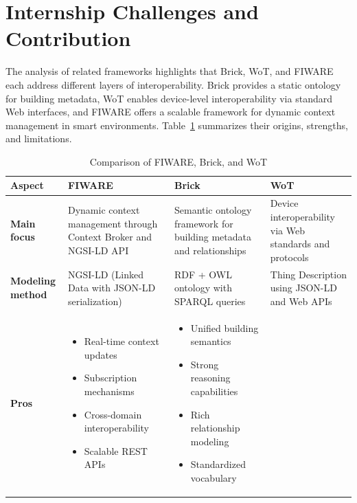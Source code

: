 \section{Internship Challenges and Contribution}

The analysis of related frameworks highlights that Brick, WoT, and
FIWARE each address different layers of interoperability.
Brick provides a static ontology for building metadata, WoT enables
device-level interoperability via standard Web interfaces, and
FIWARE offers a scalable framework for dynamic context
management in smart environments. Table~\ref{tab:comparison}
summarizes their origins, strengths, and limitations.

\begin{table}[htb]
\centering
\caption{Comparison of FIWARE, Brick, and WoT}
\label{tab:comparison}
\renewcommand{\arraystretch}{1.3} %
\begin{tabular}{|>{\raggedright\arraybackslash}p{2.8cm}|>{\raggedright\arraybackslash}p{4cm}|>{\raggedright\arraybackslash}p{4cm}|>{\raggedright\arraybackslash}p{4cm}|}
\hline
\textbf{Aspect} & \textbf{FIWARE} & \textbf{Brick} & \textbf{WoT} \\ 
\hline\hline
\textbf{Main focus} & 
Dynamic context management through Context Broker and NGSI-LD API & 
Semantic ontology framework for building metadata and relationships & 
Device interoperability via Web standards and protocols \\ 
\hline
\textbf{Modeling method} & 
NGSI-LD (Linked Data with JSON-LD serialization) & 
RDF + OWL ontology with SPARQL queries & 
Thing Description using JSON-LD and Web APIs \\ 
\hline
\textbf{Pros} & 
\begin{itemize}[leftmargin=*,nosep,after=\strut]
\item Real-time context updates
\item Subscription mechanisms
\item Cross-domain interoperability
\item Scalable REST APIs
\end{itemize} & 
\begin{itemize}[leftmargin=*,nosep,after=\strut]
\item Unified building semantics
\item Strong reasoning capabilities
\item Rich relationship modeling
\item Standardized vocabulary
\end{itemize} & 

\end{tabular}
\end{table}
